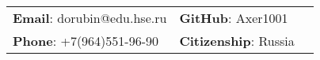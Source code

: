 \documentclass[letterpaper, 11pt]{article}
\begin{document}


\vspace{0.5cm} 
\begin{center}
\begin{tabular}{lll}
\textbf{Email}: dorubin@edu.hse.ru      &
\hspace{1in} \textbf{GitHub}: Axer1001    & \\

\textbf{Phone}: +7(964)551-96-90 &   
\hspace{1in} \textbf{Citizenship}: Russia
\end{tabular}
\end{center}


\setlength{\tabcolsep}{8pt}
\end{document}
